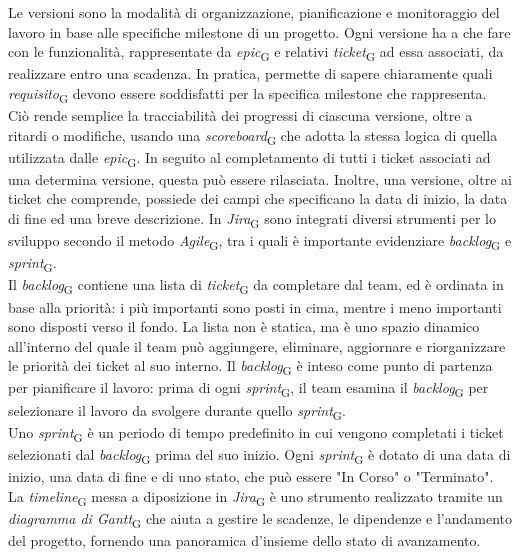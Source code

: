 Le versioni sono la modalità di organizzazione, pianificazione e monitoraggio del lavoro in base alle specifiche milestone di un progetto. Ogni versione ha a che fare con le funzionalità, rappresentate da \textit{epic}\textsubscript{G} e relativi \textit{ticket}\textsubscript{G} ad essa associati, da realizzare entro una scadenza. In pratica, permette di sapere chiaramente quali \textit{requisito}\textsubscript{G} devono essere soddisfatti per la specifica milestone che rappresenta. Ciò rende semplice la tracciabilità dei progressi di ciascuna versione, oltre a ritardi o modifiche, usando una \textit{scoreboard}\textsubscript{G} che adotta la stessa logica di quella utilizzata dalle \textit{epic}\textsubscript{G}. In seguito al completamento di tutti i ticket associati ad una determina versione, questa può essere rilasciata. Inoltre, una versione, oltre ai ticket che comprende, possiede dei campi che specificano la data di inizio, la data di fine ed una breve descrizione.
In \textit{Jira}\textsubscript{G} sono integrati diversi strumenti per lo sviluppo secondo il metodo \textit{Agile}\textsubscript{G}, tra i quali è importante evidenziare \textit{backlog}\textsubscript{G} e \textit{sprint}\textsubscript{G}.\\
Il \textit{backlog}\textsubscript{G} contiene una lista di \textit{ticket}\textsubscript{G} da completare dal team, ed è ordinata in base alla priorità: i più importanti sono posti in cima, mentre i meno importanti sono disposti verso il fondo. La lista non è statica, ma è uno spazio dinamico all'interno del quale il team può aggiungere, eliminare, aggiornare e riorganizzare le priorità dei ticket al suo interno. Il \textit{backlog}\textsubscript{G} è inteso come punto di partenza per pianificare il lavoro: prima di ogni \textit{sprint}\textsubscript{G}, il team esamina il \textit{backlog}\textsubscript{G} per selezionare il lavoro da svolgere durante quello \textit{sprint}\textsubscript{G}.\\
Uno \textit{sprint}\textsubscript{G} è un periodo di tempo predefinito in cui vengono completati i ticket selezionati dal \textit{backlog}\textsubscript{G} prima del suo inizio. Ogni \textit{sprint}\textsubscript{G} è dotato di una data di inizio, una data di fine e di uno stato, che può essere "In Corso" o "Terminato".
La \textit{timeline}\textsubscript{G} messa a diposizione in \textit{Jira}\textsubscript{G} è uno strumento realizzato tramite un \textit{diagramma di Gantt}\textsubscript{G} che aiuta a gestire le scadenze, le dipendenze e l'andamento del progetto, fornendo una panoramica d'insieme dello stato di avanzamento.\\
